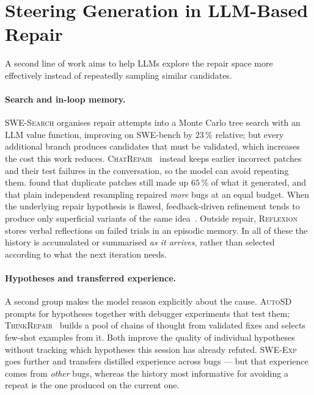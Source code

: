\section{Steering Generation in LLM-Based Repair}
\label{sec:rel-steering}

A second line of work aims to help LLMs explore the repair space more
effectively instead of repeatedly sampling similar candidates.

\paragraph{Search and in-loop memory.} \textsc{SWE-Search}
\citep{antoniades2025swesearch} organises repair attempts into a Monte Carlo
tree search with an LLM value function, improving on SWE-bench by $23\,\%$
relative; but every additional branch produces candidates that must be
validated, which increases the cost this work reduces.
\textsc{ChatRepair}~\citep{xia2024chatrepair} instead keeps earlier incorrect
patches and their test failures in the conversation, so the model can avoid
repeating them. \citet{chen2025conversational} found that duplicate patches
still made up $65\,\%$ of what it generated, and that plain independent
resampling repaired \emph{more} bugs at an equal budget. When the underlying
repair hypothesis is flawed, feedback-driven refinement tends to produce only
superficial variants of the same idea~\citep{le2026semantic}. Outside repair,
\textsc{Reflexion}~\citep{shinn2023reflexion} stores verbal reflections on
failed trials in an episodic memory. In all of these the history is
accumulated or summarised \emph{as it arrives}, rather than selected according
to what the next iteration needs.

\paragraph{Hypotheses and transferred experience.} A second group makes the
model reason explicitly about the cause. \textsc{AutoSD}~\citep{kang2025autosd}
prompts for hypotheses together with debugger experiments that test them;
\textsc{ThinkRepair}~\citep{yin2024thinkrepair} builds a pool of chains of
thought from validated fixes and selects few-shot examples from it. Both
improve the quality of individual hypotheses without tracking which hypotheses
this session has already refuted. \textsc{SWE-Exp}~\citep{chen2025sweexp} goes
further and transfers distilled experience across bugs --- but that experience
comes from \emph{other} bugs, whereas the history most informative for
avoiding a repeat is the one produced on the current one.

